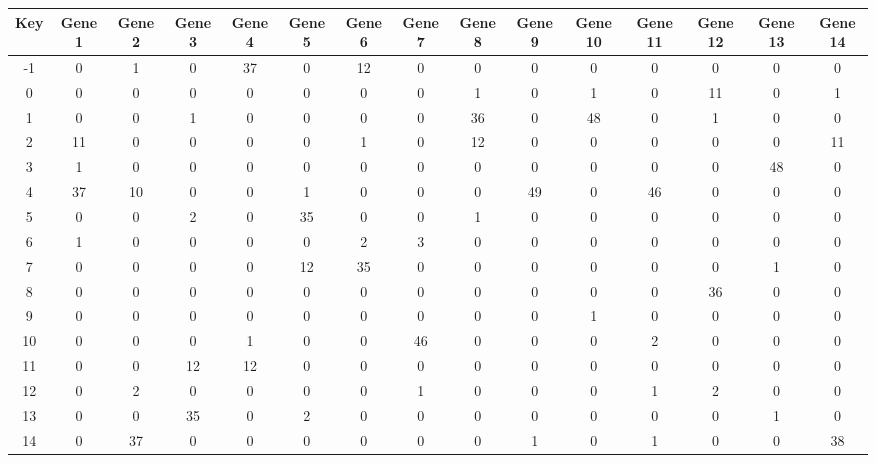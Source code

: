 \begin{tabular}{|c|c|c|c|c|c|c|c|c|c|c|c|c|c|c|}
\hline
Key & Gene 1 & Gene 2 & Gene 3 & Gene 4 & Gene 5 & Gene 6 & Gene 7 & Gene 8 & Gene 9 & Gene 10 & Gene 11 & Gene 12 & Gene 13 & Gene 14 \\
\hline
-1 & 0 & 1 & 0 & 37 & 0 & 12 & 0 & 0 & 0 & 0 & 0 & 0 & 0 & 0 \\
0 & 0 & 0 & 0 & 0 & 0 & 0 & 0 & 1 & 0 & 1 & 0 & 11 & 0 & 1 \\
1 & 0 & 0 & 1 & 0 & 0 & 0 & 0 & 36 & 0 & 48 & 0 & 1 & 0 & 0 \\
2 & 11 & 0 & 0 & 0 & 0 & 1 & 0 & 12 & 0 & 0 & 0 & 0 & 0 & 11 \\
3 & 1 & 0 & 0 & 0 & 0 & 0 & 0 & 0 & 0 & 0 & 0 & 0 & 48 & 0 \\
4 & 37 & 10 & 0 & 0 & 1 & 0 & 0 & 0 & 49 & 0 & 46 & 0 & 0 & 0 \\
5 & 0 & 0 & 2 & 0 & 35 & 0 & 0 & 1 & 0 & 0 & 0 & 0 & 0 & 0 \\
6 & 1 & 0 & 0 & 0 & 0 & 2 & 3 & 0 & 0 & 0 & 0 & 0 & 0 & 0 \\
7 & 0 & 0 & 0 & 0 & 12 & 35 & 0 & 0 & 0 & 0 & 0 & 0 & 1 & 0 \\
8 & 0 & 0 & 0 & 0 & 0 & 0 & 0 & 0 & 0 & 0 & 0 & 36 & 0 & 0 \\
9 & 0 & 0 & 0 & 0 & 0 & 0 & 0 & 0 & 0 & 1 & 0 & 0 & 0 & 0 \\
10 & 0 & 0 & 0 & 1 & 0 & 0 & 46 & 0 & 0 & 0 & 2 & 0 & 0 & 0 \\
11 & 0 & 0 & 12 & 12 & 0 & 0 & 0 & 0 & 0 & 0 & 0 & 0 & 0 & 0 \\
12 & 0 & 2 & 0 & 0 & 0 & 0 & 1 & 0 & 0 & 0 & 1 & 2 & 0 & 0 \\
13 & 0 & 0 & 35 & 0 & 2 & 0 & 0 & 0 & 0 & 0 & 0 & 0 & 1 & 0 \\
14 & 0 & 37 & 0 & 0 & 0 & 0 & 0 & 0 & 1 & 0 & 1 & 0 & 0 & 38 \\
\hline
\end{tabular}